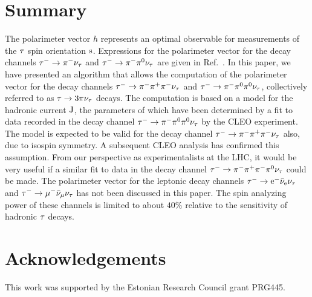 \section{Summary}
\label{sec:Summary}

The polarimeter vector $h$ represents an optimal observable for measurements of the $\tau$ spin orientation $\textrm{s}$.
Expressions for the polarimeter vector for the decay channels $\tau^{-} \to \pi^{-}\nu_{\tau}$ and $\tau^{-} \to \pi^{-}\pi^{\textrm{0}}\nu_{\tau}$ are given in Ref.~\cite{Jadach:1990mz}. In this paper, we have presented an algorithm that allows the computation of the polarimeter vector for the decay channels $\tau^{-} \to \pi^{-}\pi^{+}\pi^{-}\nu_{\tau}$ and $\tau^{-} \to \pi^{-}\pi^{\textrm{0}}\pi^{\textrm{0}}\nu_{\tau}$, collectively referred to as $\tau \to 3 \pi\nu_{\tau}$ decays. The computation is based on a model for the hadronic current $\textrm{J}$, the parameters of which have been determined by a fit to data recorded in the decay channel $\tau^{-} \to \pi^{-}\pi^{\textrm{0}}\pi^{\textrm{0}}\nu_{\tau}$ by the CLEO experiment. The model is expected to be valid for the decay channel $\tau^{-} \to \pi^{-}\pi^{+}\pi^{-}\nu_{\tau}$ also, due to isospin symmetry.
A subsequent CLEO analysis has confirmed this assumption.
From our perspective as experimentalists at the LHC, it would be very useful if a similar fit to data in the decay channel $\tau^{-} \to \pi^{-}\pi^{+}\pi^{-}\pi^{\textrm{0}}\nu_{\tau}$ could be made.
The polarimeter vector for the leptonic decay channels $\tau^{-} \to \textrm{e}^{-}\bar{\nu}_{\textrm{e}}\nu_{\tau}$ and $\tau^{-} \to \mu^{-}\bar{\nu}_{\mu}\nu_{\tau}$ has not been discussed in this paper. The spin analyzing power of these channels is limited to about $40\%$ relative to the sensitivity of hadronic $\tau$ decays.


\section*{Acknowledgements}
This work was supported by the Estonian Research Council grant PRG445.



 

